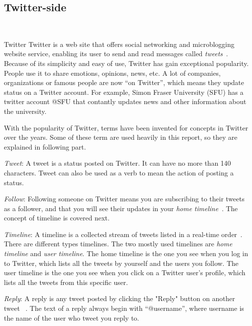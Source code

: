 \subsection{Twitter-side}

\begin{description} \hfill \\
\item{Twitter} Twitter is a web site that offers social networking and
  microblogging website service, enabling its user to send and read
  messages called \textit{tweets}~\cite{twitter_wiki}. Because of its
  simplicity and easy of use, Twitter has gain exceptional popularity.
  People use it to share emotions, opinions, news, etc.  A lot of
  companies, organizations or famous people are now ``on Twitter'',
  which means they update status on a Twitter account.  For example,
  Simon Fraser University (SFU) has a twitter account @SFU that
  contantly updates news and other information about the university.

  With the popularity of Twitter, terms have been invented for concepts
in Twitter over the years. Some of these term are used heavily in this
report, so they are explained in following part.

\begin{description}

\item \textit{Tweet}: A tweet is a status posted on Twitter. It can
  have no more than 140 characters. Tweet can also be used as a verb
  to mean the action of posting a status.

\item \textit{Follow}: Following someone on Twitter means you are
  subscribing to their tweets as a follower, and that you will see
  their updates in your \textit{home timeline}~\cite{follow}. The
  concept of timeline is covered next.

\item \textit{Timeline}: A timeline is a collected stream of tweets
  listed in a real-time order~\cite{timeline}. There are different
  types timelines. The two mostly used timelines are \textit{home
    timeline} and \textit{user timeline}. The home timeline is the one
  you see when you log in to Twitter, which lists all the tweets by
  yourself and the users you follow. The user timeline is the one you
  see when you click on a Twitter user's profile, which lists all the
  tweets from this specific user.

\item \textit{Reply}: A reply is any tweet posted by clicking the
  "Reply" button on another tweet ~\cite{mention_reply}. The text of a
  reply always begin with ``@username'', where username is the name of
  the user who tweet you reply to.


\end{description}
\end{description}
